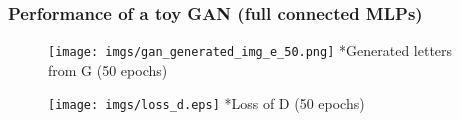\documentclass{beamer}
\begin{document}
\begin{frame}
\frametitle{Performance of a toy GAN (full connected MLPs)}
\begin{figure}
\centering
\begin{minipage}{.5\textwidth}
  \centering
  \texttt{[image: imgs/gan\_generated\_img\_e\_50.png]}
  *{Generated letters from G (50 epochs)}
  \label{fig:test1}
\end{minipage}%
\begin{minipage}{.5\textwidth}
  \centering
  \texttt{[image: imgs/loss\_d.eps]}
  *{Loss of D (50 epochs)}
  \label{fig:test2}
\end{minipage}
\end{figure}
\end{frame}






\end{document}
